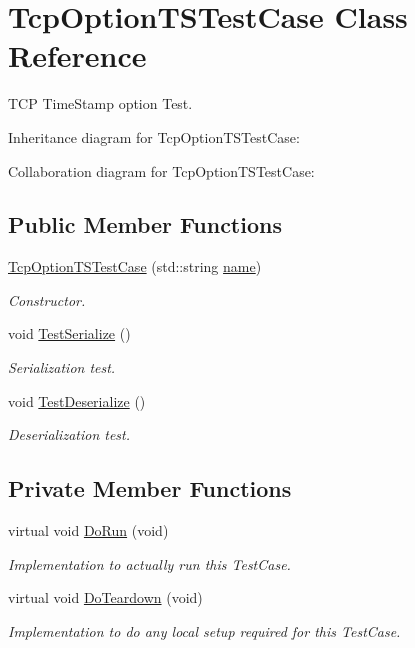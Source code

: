 \hypertarget{classTcpOptionTSTestCase}{}\section{Tcp\+Option\+T\+S\+Test\+Case Class Reference}
\label{classTcpOptionTSTestCase}


T\+CP Time\+Stamp option Test.  




Inheritance diagram for Tcp\+Option\+T\+S\+Test\+Case\+:


Collaboration diagram for Tcp\+Option\+T\+S\+Test\+Case\+:
\subsection*{Public Member Functions}
\begin{DoxyCompactItemize}
\item 
\hyperlink{classTcpOptionTSTestCase_ac6a84a16343c92db3088f62ad0fe12d2}{Tcp\+Option\+T\+S\+Test\+Case} (std\+::string \hyperlink{generate__test__data__lte__spectrum__model_8m_ab74e6bf80237ddc4109968cedc58c151}{name})
\begin{DoxyCompactList}\small\item\em Constructor. \end{DoxyCompactList}\item 
void \hyperlink{classTcpOptionTSTestCase_a14597883403704320352bf1caad38777}{Test\+Serialize} ()
\begin{DoxyCompactList}\small\item\em Serialization test. \end{DoxyCompactList}\item 
void \hyperlink{classTcpOptionTSTestCase_aadd81683ca04ef16306e8571c67dcf65}{Test\+Deserialize} ()
\begin{DoxyCompactList}\small\item\em Deserialization test. \end{DoxyCompactList}\end{DoxyCompactItemize}
\subsection*{Private Member Functions}
\begin{DoxyCompactItemize}
\item 
virtual void \hyperlink{classTcpOptionTSTestCase_a53011c31faadadd5da00292ee7544b35}{Do\+Run} (void)
\begin{DoxyCompactList}\small\item\em Implementation to actually run this Test\+Case. \end{DoxyCompactList}\item 
virtual void \hyperlink{classTcpOptionTSTestCase_a633176b83dd9cf6ad643225dfd253e63}{Do\+Teardown} (void)
\begin{DoxyCompactList}\small\item\em Implementation to do any local setup required for this Test\+Case. \end{DoxyCompactList}\end{DoxyCompactItemize}
